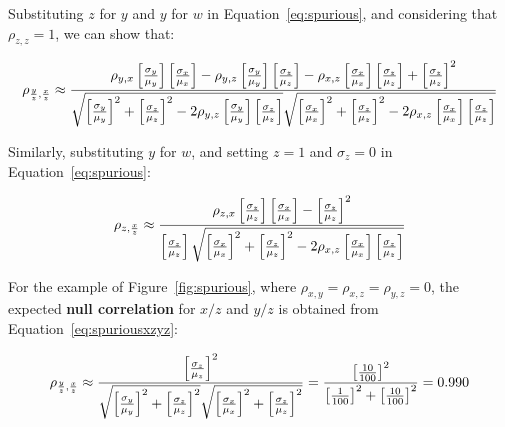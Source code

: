 \begin{enumerate}
Substituting $z$ for $y$ and $y$ for $w$ in
Equation~\ref{eq:spurious}, and considering that $\rho_{z,z}=1$, we
can show that:

\begin{equation}
  \noindent \rho_{\frac{y}{z},\frac{x}{z}} \approx
  \frac{\rho_{y,x}\left[\frac{\sigma_y}{\mu_y}\right]
    \left[\frac{\sigma_x}{\mu_x}\right] -
    \rho_{y,z}\left[\frac{\sigma_y}{\mu_y}\right]
    \left[\frac{\sigma_z}{\mu_z}\right] -
    \rho_{x,z}\left[\frac{\sigma_x}{\mu_x}\right]
    \left[\frac{\sigma_z}{\mu_z}\right] +
    \left[\frac{\sigma_z}{\mu_z}\right]^2
  }{
    \sqrt{\left[\frac{\sigma_y}{\mu_y}\right]^2 +
      \left[\frac{\sigma_z}{\mu_z}\right]^2 -
      2 \rho_{y,z}\left[\frac{\sigma_y}{\mu_y}\right]
      \left[\frac{\sigma_z}{\mu_z}\right]}
    \sqrt{\left[\frac{\sigma_x}{\mu_x}\right]^2 +
      \left[\frac{\sigma_z}{\mu_z}\right]^2 -
      2 \rho_{x,z}\left[\frac{\sigma_x}{\mu_x}\right]
      \left[\frac{\sigma_z}{\mu_z}\right]
    }
  }
  \label{eq:spuriousxzyz}
\end{equation}

Similarly, substituting $y$ for $w$, and setting $z=1$ and
$\sigma_z=0$ in Equation~\ref{eq:spurious}:

\begin{equation}
  \noindent \rho_{z,\frac{x}{z}} \approx
  \frac{\rho_{z,x}\left[\frac{\sigma_z}{\mu_z}\right]
    \left[\frac{\sigma_x}{\mu_x}\right] -
    \left[\frac{\sigma_z}{\mu_z}\right]^2
  }{
    \left[\frac{\sigma_z}{\mu_z}\right]
    \sqrt{\left[\frac{\sigma_x}{\mu_x}\right]^2 +
      \left[\frac{\sigma_z}{\mu_z}\right]^2 -
      2 \rho_{x,z}\left[\frac{\sigma_x}{\mu_x}\right]
      \left[\frac{\sigma_z}{\mu_z}\right]
    }
  }
  \label{eq:spuriouszxz}
\end{equation}

For the example of Figure~\ref{fig:spurious}, where
$\rho_{x,y}=\rho_{x,z}=\rho_{y,z}=0$, the expected \textbf{null
  correlation} for $x/z$ and $y/z$ is obtained from
Equation~\ref{eq:spuriousxzyz}:

\begin{equation}
  \noindent \rho_{\frac{y}{z},\frac{x}{z}} \approx
  \frac{
    \left[\frac{\sigma_z}{\mu_z}\right]^2
  }{
    \sqrt{\left[\frac{\sigma_y}{\mu_y}\right]^2 +
      \left[\frac{\sigma_z}{\mu_z}\right]^2}
    \sqrt{\left[\frac{\sigma_x}{\mu_x}\right]^2 +
      \left[\frac{\sigma_z}{\mu_z}\right]^2}
  }
  =
  \frac{
    \left[\frac{10}{100}\right]^2
  }{
    \left[\frac{1}{100}\right]^2 +
      \left[\frac{10}{100}\right]^2
  }
  = 0.990
  \label{eq:spuriousxzyzindepxyz}
\end{equation}


\end{enumerate}
